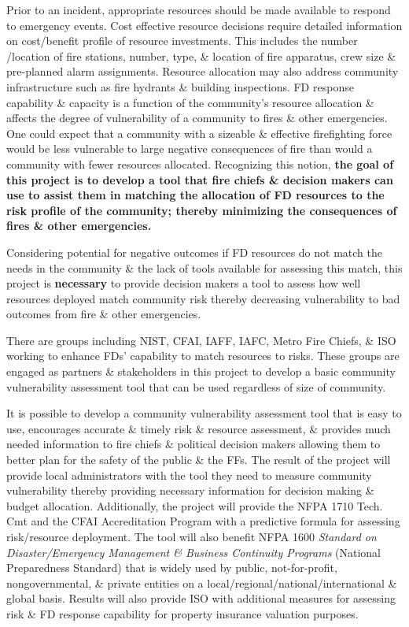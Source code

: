 \documentclass[12pt,letterpaper]{article}
\begin{document}
Prior to an incident, appropriate resources should be made available to respond to emergency events. Cost effective resource decisions require detailed information on cost/benefit profile of resource investments. This includes the number /location of fire stations, number, type, \& location of fire apparatus, crew size \& pre-planned alarm assignments. Resource allocation may also address community infrastructure such as fire hydrants \& building inspections.  FD response capability \& capacity is a function of the community’s resource allocation \& affects the degree of vulnerability of a community to fires \& other emergencies. One could expect that a community with a sizeable \& effective firefighting force would be less vulnerable to large negative consequences of fire than would a community with fewer resources allocated. Recognizing this notion, {\bf the goal of this project is to develop a tool that fire chiefs \& decision makers can use to assist them in matching the allocation of FD resources to the risk profile of the community; thereby minimizing the consequences of fires \& other emergencies.}

Considering potential for negative outcomes if FD resources do not match the needs in the community \& the lack of tools available for assessing this match, this project is {\bf necessary} to provide decision makers a tool to assess how well resources deployed match community risk thereby decreasing vulnerability to bad outcomes from fire \& other emergencies.

There are groups including NIST, CFAI, IAFF, IAFC, Metro Fire Chiefs, \& ISO working to enhance FDs' capability to match resources to risks. These groups are engaged as partners \& stakeholders in this project to develop a basic community vulnerability assessment tool that can be used regardless of size of community.

It is possible to develop a community vulnerability assessment tool that is easy to use, encourages accurate \& timely risk \& resource assessment, \& provides much needed information to fire chiefs \& political decision makers allowing them to better plan for the safety of the public \& the FFs. The result of the project will provide local administrators with the tool they need to measure community vulnerability thereby providing necessary information for decision making \& budget allocation. Additionally, the project will provide the NFPA 1710 Tech. Cmt and the CFAI Accreditation Program with a predictive formula for assessing risk/resource deployment. The tool will also benefit NFPA 1600 {\em Standard on Disaster/Emergency Management \& Business Continuity Programs} (National Preparedness Standard) that is widely used by public, not-for-profit, nongovernmental, \& private entities on a local/regional/national/international \& global basis.  Results will also provide ISO with additional measures for assessing risk \& FD response capability for property insurance valuation purposes.
\end{document}
